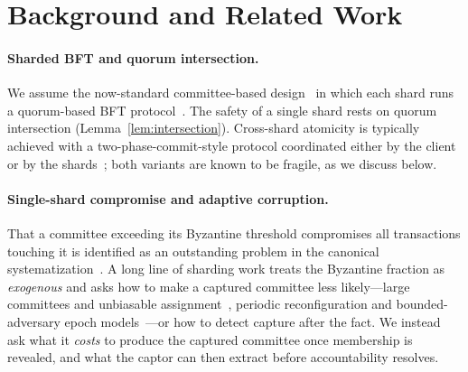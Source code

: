 \section{Background and Related Work}
\label{sec:related}
\label{sec:background}

\paragraph{Sharded BFT and quorum intersection.}
We assume the now-standard committee-based design~\cite{luu2016elastico,kokoris2018omniledger,zamani2018rapidchain}
in which each shard runs a quorum-based BFT protocol~\cite{castro1999pbft,yin2019hotstuff,buchman2018tendermint}.
The safety of a single shard rests on quorum intersection (Lemma~\ref{lem:intersection}). Cross-shard
atomicity is typically achieved with a two-phase-commit-style protocol coordinated either by the
client or by the shards~\cite{kokoris2018omniledger}; both variants are known to be fragile, as we
discuss below.

\paragraph{Single-shard compromise and adaptive corruption.}
That a committee exceeding its Byzantine threshold compromises all transactions touching it is
identified as an outstanding problem in the canonical systematization~\cite{bano2019sok}. A long
line of sharding work treats the Byzantine fraction as \emph{exogenous} and asks how to make a
captured committee less likely---large committees and unbiasable assignment~\cite{luu2016elastico},
periodic reconfiguration and bounded-adversary epoch models~\cite{zamani2018rapidchain}---or how to
detect capture after the fact. We instead ask what it \emph{costs} to produce the captured committee
once membership is revealed, and what the captor can then extract before accountability resolves.

